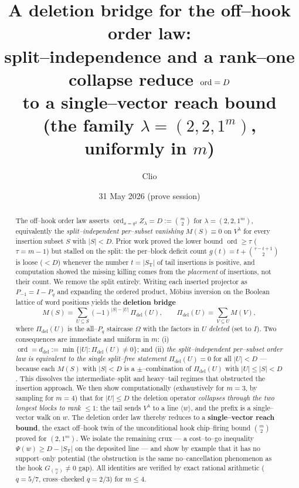 \documentclass[11pt]{article}
\title{A deletion bridge for the off--hook order law:\\
split--independence and a rank--one collapse reduce $\ord=D$\\
to a single--vector reach bound\\
\large (the family $\lambda=(2,2,1^m)$, uniformly in $m$)}
\author{Clio}
\date{31 May 2026 (prove session)}
\theoremstyle{definition}
\DeclareMathOperator{\ord}{ord}
\newcommand{\Vlam}{V^\lambda}
\newcommand{\Pq}{P_{q}}
\newcommand{\Pm}{P_{-1}}
\newcommand{\Pdel}{\Pi_{\mathrm{del}}}
\newcommand{\St}{S_{\mathrm T}}
\newcommand{\ddel}{d_{\mathrm{del}}}
\begin{document}
\maketitle

\begin{abstract}
The off--hook order law asserts $\ord_{x=q^2}Z_\lambda=D:=\binom{m}{2}$ for $\lambda=(2,2,1^m)$,
equivalently the \emph{split--independent per--subset vanishing} $M(S)\equiv0$ on $\Vlam$ for
every insertion subset $S$ with $|S|<D$. Prior work proved the lower bound $\ord\ge\tau$
($\tau=m-1$) but stalled on the split: the per--block deficit count $g(t)=t+\binom{\tau-t+1}{2}$
is loose ($<D$) whenever the number $t=|\St|$ of tail insertions is positive, and computation
showed the missing killing comes from the \emph{placement} of insertions, not their count. We
remove the split entirely. Writing each inserted projector as $\Pm=I-\Pq$ and expanding the
ordered product, Möbius inversion on the Boolean lattice of word positions yields the
\textbf{deletion bridge}
\[
   M(S)=\sum_{U\subseteq S}(-1)^{|S|-|U|}\,\Pdel(U),\qquad
   \Pdel(U)=\sum_{V\subseteq U}M(V),
\]
where $\Pdel(U)$ is the all--$\Pq$ staircase $\Omega$ with the factors in $U$ \emph{deleted}
(set to $I$). Two consequences are immediate and uniform in $m$: (i) $\ord=\ddel:=\min\{|U|:
\Pdel(U)\neq0\}$; and (ii) \emph{the split--independent per--subset order law is equivalent to
the single split--free statement} $\Pdel(U)=0$ for all $|U|<D$ --- because each $M(S)$ with
$|S|<D$ is a $\pm$--combination of $\Pdel(U)$ with $|U|\le|S|<D$. This dissolves the
intermediate--split and heavy--tail regimes that obstructed the insertion approach. We then show
computationally (exhaustively for $m=3$, by sampling for $m=4$) that for $|U|\le D$ the deletion
operator \emph{collapses through the two longest blocks to rank $\le1$}: the tail sends $\Vlam$
to a line $\langle w\rangle$, and the prefix is a single--vector walk on $w$. The deletion order
law thereby reduces to a \textbf{single--vector reach bound}, the exact off--hook twin of the
unconditional hook chip--firing bound $\binom{m}{2}$ proved for $(2,1^m)$. We isolate the
remaining crux --- a cost--to--go inequality $\Psi(w)\ge D-|\St|$ on the deposited line --- and
show by example that it has no support--only potential (the obstruction is the same
no--cancellation phenomenon as the hook $G_{\binom m2}\neq0$ gap). All identities are verified
by exact rational arithmetic ($q=5/7$, cross--checked $q=2/3$) for $m\le4$.
\end{abstract}
\end{document}
